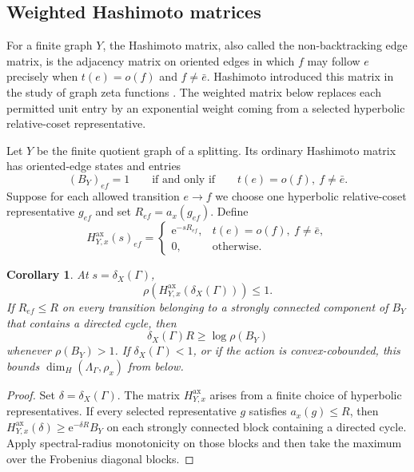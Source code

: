 \documentclass[11pt]{article}
\newtheorem{corollary}[corollary]{Corollary}
\theoremstyle{definition}
\newcommand{\ax}{\mathrm{ax}}
\newcommand{\e}{\mathrm e}
\begin{document}
\subsection{Weighted Hashimoto matrices}
For a finite graph $Y$, the Hashimoto matrix, also called the non-backtracking edge matrix,
is the adjacency matrix on oriented edges in which $f$ may follow $e$ precisely when
$t(e)=o(f)$ and $f\ne\bar e$.  Hashimoto introduced this matrix in the study of graph zeta
functions \cite[Section~1]{Hashimoto1989}.  The weighted matrix below replaces
each permitted unit entry by an exponential weight coming from a selected hyperbolic
relative-coset representative.

Let $Y$ be the finite quotient graph of a splitting.  Its ordinary Hashimoto matrix has
oriented-edge states and entries
\[
 (B_Y)_{ef}=1
 \qquad\mbox{if and only if}\qquad
 t(e)=o(f),\ f\ne\bar e.
\]
Suppose for each allowed transition $e\to f$ we choose one hyperbolic relative-coset representative
$g_{ef}$ and set $R_{ef}=a_x(g_{ef})$.  Define
\[
 H^{\ax}_{Y,x}(s)_{ef}=
 \begin{cases}
 \e^{-sR_{ef}},&t(e)=o(f),\ f\ne\bar e,\\
 0,&\text{otherwise}.
 \end{cases}
\]

\begin{corollary}
\label{cor:hashimoto-axis-bound}
At $s=\delta_X(\Gamma)$,
\begin{equation}\label{eq:hashimoto-axis-bound}
 \rho(H^{\ax}_{Y,x}(\delta_X(\Gamma)))\le1.
\end{equation}
If $R_{ef}\le R$ on every transition belonging to a strongly connected component of $B_Y$ that contains a directed cycle, then
\begin{equation}\label{eq:hashimoto-dimension}
 \delta_X(\Gamma)R\ge\log\rho(B_Y)
\end{equation}
whenever $\rho(B_Y)>1$.  If $\delta_X(\Gamma)<1$, or if the action is convex-cobounded, this bounds
$\dim_H(\Lambda_\Gamma,\rho_x)$ from below.
\end{corollary}

\begin{proof}
Set $\delta=\delta_X(\Gamma)$.  The matrix $H^{\ax}_{Y,x}$ arises from a finite choice of hyperbolic representatives.  If every selected representative $g$ satisfies $a_x(g)\le R$, then
$H^{\ax}_{Y,x}(\delta)\ge\e^{-\delta R}B_Y$ on each strongly connected block containing a directed cycle.  Apply spectral-radius monotonicity on those blocks and then take the maximum over the Frobenius diagonal blocks.
\end{proof}
\end{document}
